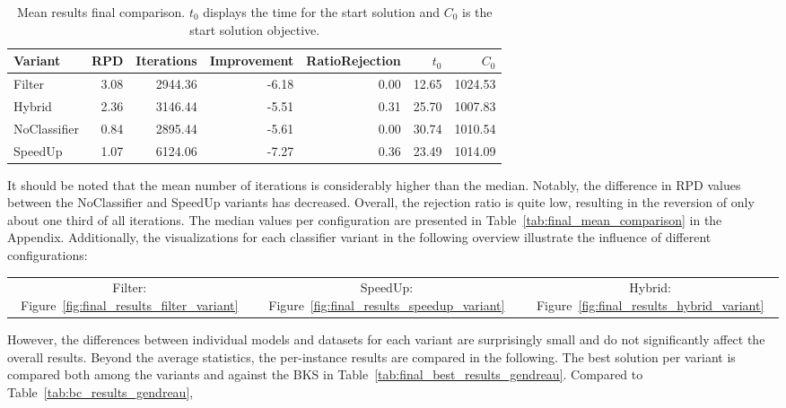 \begin{table}
    \centering
    \begin{tabular}{lrrrrrr}
        \toprule
        Variant      & RPD  & Iterations & Improvement & RatioRejection & $t_0$ & $C_0$   \\
        \midrule
        Filter       & 3.08 & 2944.36    & -6.18       & 0.00           & 12.65 & 1024.53 \\
        Hybrid       & 2.36 & 3146.44    & -5.51       & 0.31           & 25.70 & 1007.83 \\
        NoClassifier & 0.84 & 2895.44    & -5.61       & 0.00           & 30.74 & 1010.54 \\
        SpeedUp      & 1.07 & 6124.06    & -7.27       & 0.36           & 23.49 & 1014.09 \\
        \bottomrule
    \end{tabular}
    \caption[Mean results final comparison.]{Mean results final comparison. $t_0$ displays the time for the start solution and $C_0$ is the start solution objective.}
    \label{tab:mean_final_results}
\end{table}
It should be noted that the mean number of iterations is considerably higher than the median. Notably, the difference in \gls{RPD}
values between the NoClassifier and SpeedUp variants has decreased. Overall, the rejection ratio is quite low, resulting in
the reversion of only about one third of all iterations. The median values per configuration are presented in
Table~\ref{tab:final_mean_comparison} in the Appendix. Additionally, the visualizations for each classifier variant in the following overview
illustrate the influence of different configurations:
\begin{table}[ht]
    \centering
    \setlength{\tabcolsep}{12pt}
    \begin{tabular}{ccc}
        Filter: Figure~\ref{fig:final_results_filter_variant} & SpeedUp: Figure~\ref{fig:final_results_speedup_variant} & Hybrid: Figure~\ref{fig:final_results_hybrid_variant}
    \end{tabular}
\end{table}
However, the differences between individual models and datasets for each variant are surprisingly small and do not significantly
affect the overall results. Beyond the average statistics, the per-instance results are compared in the following. The best solution
per variant is compared both among the variants and against the \gls{BKS} in Table~\ref{tab:final_best_results_gendreau}. Compared to Table~\ref{tab:bc_results_gendreau},

